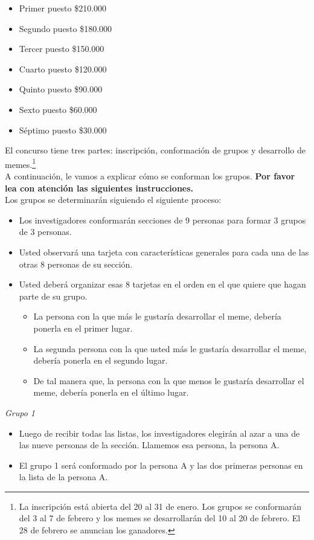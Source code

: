 \begin{itemize}
    \item Primer puesto \$210.000
    \item Segundo puesto \$180.000
    \item Tercer puesto \$150.000
    \item Cuarto puesto \$120.000
    \item Quinto puesto \$90.000
    \item Sexto puesto \$60.000
    \item Séptimo puesto \$30.000
\end{itemize}
El concurso tiene tres partes: inscripción, conformación de grupos y desarrollo de memes.\footnote{La inscripción está abierta del 20 al 31 de enero. Los grupos se conformarán del 3 al 7 de febrero y los memes se desarrollarán del 10 al 20 de febrero. El 28 de febrero se anuncian los ganadores.}\\
A continuación, le vamos a explicar cómo se conforman los grupos. \textbf{Por favor lea con atención las siguientes instrucciones.}\\
Los grupos se determinarán siguiendo el siguiente proceso:
\begin{itemize}
    \item Los investigadores conformarán secciones de 9 personas para formar 3 grupos de 3 personas.
    \item Usted observará una tarjeta con características generales para cada una de las otras 8 personas de su sección.
    \item Usted deberá organizar esas 8 tarjetas en el orden en el que quiere que hagan parte de su grupo.
    \begin{itemize}
        \item La persona con la que más le gustaría desarrollar el meme, debería ponerla en el primer lugar.
        \item La segunda persona con la que usted más le gustaría desarrollar el meme, debería ponerla en el segundo lugar.
        \item De tal manera que, la persona con la que menos le gustaría desarrollar el meme, debería ponerla en el último lugar.
    \end{itemize}
\end{itemize}
\textit{Grupo 1}
\begin{itemize}
    \item Luego de recibir todas las listas, los investigadores elegirán al azar a una de las nueve personas de la sección. Llamemos esa persona, la persona A.
    \item El grupo 1 será conformado por la persona A y las dos primeras personas en la lista de la persona A.
\end{itemize}
